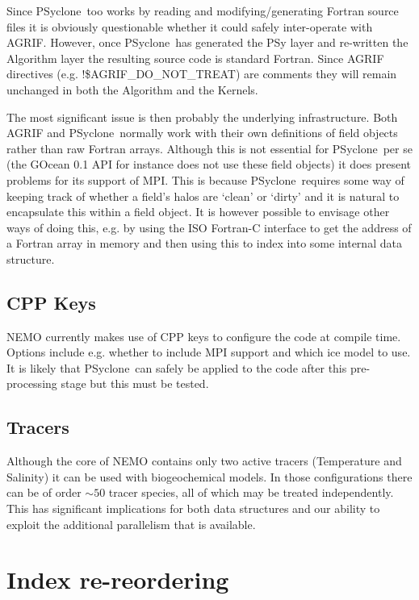 \documentclass{article}
\newcommand{\psyclone}{{PS}yclone}
\begin{document}
Since \psyclone\ too works by reading and modifying/generating Fortran
source files it is obviously questionable whether it could safely
inter-operate with AGRIF. However, once \psyclone\ has generated the PSy
layer and re-written the Algorithm layer the resulting source code is
standard Fortran. Since AGRIF directives
(e.g. !\$AGRIF\_DO\_NOT\_TREAT) are comments they will remain unchanged
in both the Algorithm and the Kernels.

The most significant issue is then probably the underlying
infrastructure.  Both AGRIF and \psyclone\ normally work with their own
definitions of field objects rather than raw Fortran arrays. Although
this is not essential for \psyclone\ per se (the GOcean 0.1 API for
instance does not use these field objects) it does present problems
for its support of MPI. This is because \psyclone\ requires some way of
keeping track of whether a field's halos are `clean' or `dirty' and it
is natural to encapsulate this within a field object. It is however
possible to envisage other ways of doing this, e.g. by using the ISO
Fortran-C interface to get the address of a Fortran array in memory
and then using this to index into some internal data structure.

\subsection{CPP Keys}

NEMO currently makes use of CPP keys to configure the code at compile
time. Options include e.g. whether to include MPI support and which
ice model to use. It is likely that \psyclone\ can safely be applied to
the code after this pre-processing stage but this must be tested.

\subsection{Tracers}

Although the core of NEMO contains only two active tracers
(Temperature and Salinity) it can be used with biogeochemical
models. In those configurations there can be of order $\sim 50$ tracer
species, all of which may be treated independently. This has
significant implications for both data structures and our ability to
exploit the additional parallelism that is available.

\section{Index re-reordering}
\end{document}
